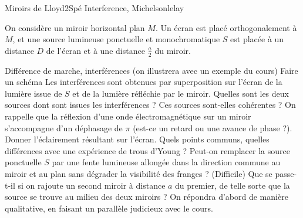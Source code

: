 \begin{exercise}{Miroirs de Lloyd}{2}{Spé}
{Interference, Michelson}{lelay}

On considère un miroir horizontal plan $M$. Un écran est placé orthogonalement à $M$, et une source lumineuse ponctuelle et monochromatique $S$ est placée à un distance $D$ de l'écran et à une distance $\frac{a}2$ du miroir.

\begin{questions}
    \questioncours Différence de marche, interférences (on illustrera avec un exemple du cours)
    \question Faire un schéma
    \question Les interférences sont obtenues par superposition sur l'écran de la lumière issue de $S$ et de la lumière réfléchie par le miroir. Quelles sont les deux sources dont sont issues les interférences ?
    \question Ces sources sont-elles cohérentes ? On rappelle que la réflexion d'une onde électromagnétique sur un miroir s'accompagne d'un déphasage de $\pi$ (est-ce un retard ou une avance de phase ?).
    \question Donner l'éclairement résultant sur l'écran. Quels points communs, quelles différences avec une expérience de trous d'Young ?
    \question Peut-on remplacer la source ponctuelle $S$ par une fente lumineuse allongée dans la direction commune au miroir et au plan sans dégrader la visibilité des franges ?
    \question (Difficile) Que se passe-t-il si on rajoute un second miroir à distance $a$ du premier, de telle sorte que la source se trouve au milieu des deux miroirs ? On répondra d'abord de manière qualitative, en faisant un parallèle judicieux avec le cours.
\end{questions}

\end{exercise} 
